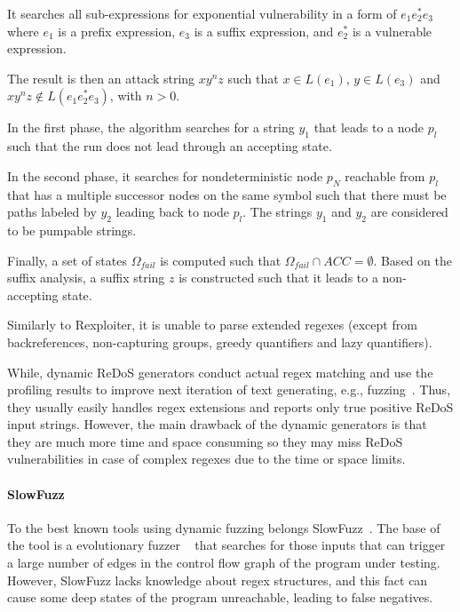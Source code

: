 \documentclass[acmsmall,screen]{acmart}
\begin{document}
%
It searches all sub-expressions for exponential vulnerability in a form of $e_1e_{2}^{*}e_3$ where $e_1$ is a prefix expression, $e_3$ is a suffix expression, and $e_{2}^{*}$ is a vulnerable expression.

The result is then an attack string $xy^{n}z$ such that $x\in L(e_1)$, $y\in L(e_3)$ and $xy^{n}z\not\in L(e_1e_{2}^{*}e_3)$, with $n>0$.

In the first phase, the algorithm searches for a string $y_1$ that leads to a node $p_l$ such that the run does not lead through an accepting state.

In the second phase, it searches for nondeterministic node $p_N$ reachable from $p_l$ that has a multiple successor nodes on the same symbol such that there must be paths labeled by $y_2$ leading back to node $p_l$. The strings $y_1$ and $y_2$ are considered to be pumpable strings.

Finally, a set of states $\Omega_{fail}$ is computed such that $\Omega_{fail} \cap \textit{ACC} = \emptyset$. Based on the suffix analysis, a suffix string $z$ is constructed such that it leads to a non-accepting state.

%
Similarly to Rexploiter, it is unable to parse extended regexes (except from backreferences, non-capturing groups, greedy quantifiers and lazy quantifiers).
%



%
While, dynamic ReDoS generators conduct actual regex matching and
use the profiling results to improve next iteration of text generating, 
e.g., fuzzing~\cite{fuzz1}. 
%
Thus, they usually easily handles regex extensions
and reports only true positive ReDoS input strings. 
%
However, the main drawback of the dynamic generators is that
they are much more time and space consuming so they may
miss ReDoS vulnerabilities in case of complex regexes due
to the time or space limits.
%


\paragraph{SlowFuzz}
To the best known tools using dynamic fuzzing belongs
SlowFuzz~\cite{slowfuzz}.
%
The base of the tool is a evolutionary fuzzer ~\cite{libfuzz}
that searches for those inputs that can trigger a
large number of edges in the control flow graph of the program
under testing. 
%
However, SlowFuzz lacks knowledge about regex structures, and this fact can cause some
deep states of the program unreachable, leading to false negatives.
\end{document}
